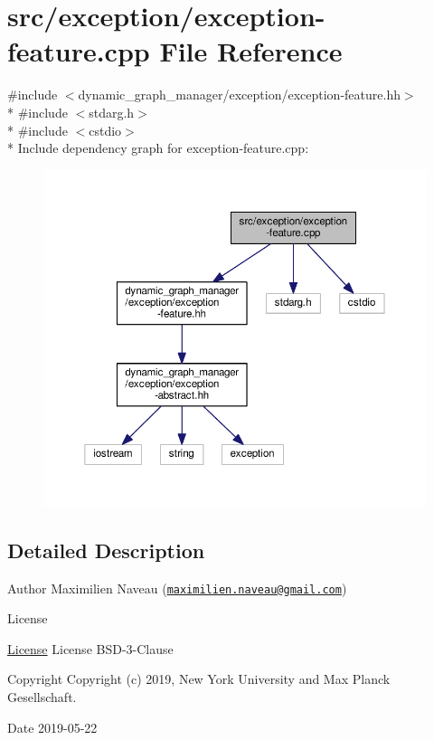 \hypertarget{exception-feature_8cpp}{}\section{src/exception/exception-\/feature.cpp File Reference}
\label{exception-feature_8cpp}
{\ttfamily \#include $<$dynamic\+\_\+graph\+\_\+manager/exception/exception-\/feature.\+hh$>$}\\*
{\ttfamily \#include $<$stdarg.\+h$>$}\\*
{\ttfamily \#include $<$cstdio$>$}\\*
Include dependency graph for exception-\/feature.cpp\+:
\nopagebreak
\begin{figure}[H]
\begin{center}
\leavevmode
\includegraphics[width=350pt]{exception-feature_8cpp__incl}
\end{center}
\end{figure}


\subsection{Detailed Description}
\begin{DoxyAuthor}{Author}
Maximilien Naveau (\href{mailto:maximilien.naveau@gmail.com}{\tt maximilien.\+naveau@gmail.\+com}) 
\end{DoxyAuthor}
\begin{DoxyRefDesc}{License}
\item[\hyperlink{license__license000049}{License}]License B\+S\+D-\/3-\/\+Clause \end{DoxyRefDesc}
\begin{DoxyCopyright}{Copyright}
Copyright (c) 2019, New York University and Max Planck Gesellschaft. 
\end{DoxyCopyright}
\begin{DoxyDate}{Date}
2019-\/05-\/22 
\end{DoxyDate}
